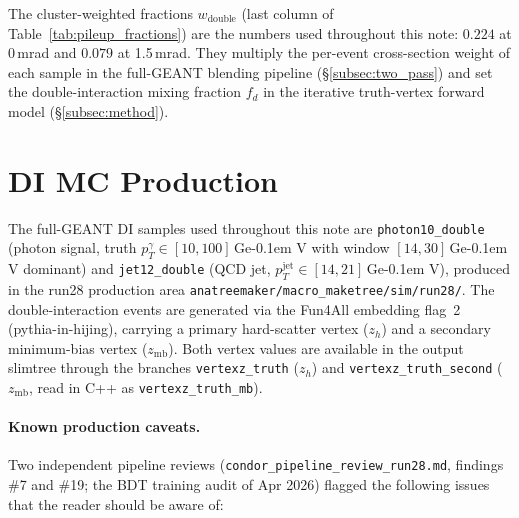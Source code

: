 \documentclass[11pt,a4paper]{article}
\newcommand{\GeV}{\ifmmode {\mathrm{\ Ge\kern -0.1em V}}\else\textrm{Ge\kern -0.1em V}\fi\xspace}
\begin{document}
The cluster-weighted fractions $w_{\text{double}}$ (last column of
Table~\ref{tab:pileup_fractions}) are the numbers used throughout
this note: $0.224$ at 0\,mrad and $0.079$ at 1.5\,mrad. They
multiply the per-event cross-section weight of each sample in the
full-GEANT blending pipeline (\S\ref{subsec:two_pass}) and set the
double-interaction mixing fraction $f_d$ in the iterative truth-vertex
forward model (\S\ref{subsec:method}).


\section{DI MC Production}
\label{sec:production}

The full-GEANT DI samples used throughout this note are
\texttt{photon10\_double} (photon signal, truth $p_T^\gamma \in
[10,100]$\,\GeV with window $[14,30]$\,\GeV dominant) and
\texttt{jet12\_double} (QCD jet, $p_T^{\text{jet}}\in[14,21]$\,\GeV),
produced in the run28 production area
\texttt{anatreemaker/macro\_maketree/sim/run28/}. The double-interaction
events are generated via the Fun4All embedding flag~2
(pythia-in-hijing), carrying a primary hard-scatter vertex ($z_h$) and
a secondary minimum-bias vertex ($z_\mathrm{mb}$). Both vertex values
are available in the output slimtree through the branches
\texttt{vertexz\_truth} ($z_h$) and \texttt{vertexz\_truth\_second}
($z_\mathrm{mb}$, read in C++ as \texttt{vertexz\_truth\_mb}).

\paragraph{Known production caveats.} Two independent pipeline reviews
(\texttt{condor\_pipeline\_review\_run28.md}, findings \#7 and \#19;
the BDT training audit of Apr 2026) flagged the following issues that
the reader should be aware of:
\end{document}
